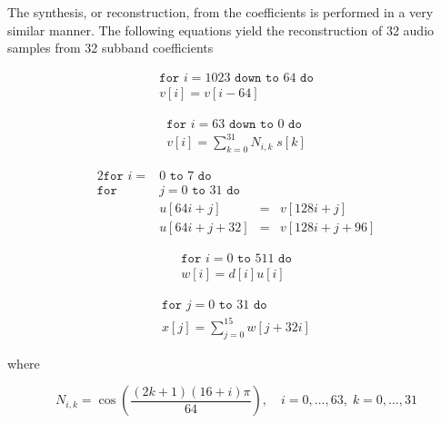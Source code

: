 \documentclass{article} %
\begin{document}
The synthesis, or reconstruction, from the coefficients is performed
in a very similar manner. The following equations yield the reconstruction
of 32 audio samples from 32 subband coefficients

\begin{align}
\label{eq:vshift}
\texttt{for } i=1023 \texttt{ down to } 64 \texttt{ do}\nonumber \\
v[i]=v[i-64]
\end{align}

\begin{align}
\label{eq:Nisk}
\texttt{for } i=63 \texttt{ down to } 0 \texttt{ do} \nonumber \\
v[i]=\sum\limits_{k=0}^{31} N_{i,k} \; s[k]
\end{align}

\begin{alignat}{2}
\texttt{for } i=&0 \texttt{ to } 7 \texttt{ do} \nonumber \\
\texttt{for } &j=0 \texttt{ to } 31 \texttt{ do} \nonumber \\
& u[64i+j] &=&v[128i+j] \label{eq:ushift1}\\
& u[64i+j+32] &= &v[128i+j+96]\label{eq:ushift2} 
\end{alignat}


\begin{align}
\texttt{for } i=0 \texttt{ to } 511 \texttt{ do} \nonumber \\
w[i]=d[i] u[i] \label{eq:wi}
\end{align}

\begin{align}
\texttt{for } j=0 \texttt{ to } 31 \texttt{ do} \nonumber \\
x[j]=\sum\limits_{j=0}^{15} w[j+32i] \label{eq:xj}
\end{align}

where

\begin{equation}
\label{eq:nik}
\boxed{
N_{i,k}=\cos \left( \frac{(2k+1)(16+i)\pi}{64}\right), 
\quad i=0,\dots,63, \; k=0,\dots,31
}
\end{equation}

% 
\end{document}
